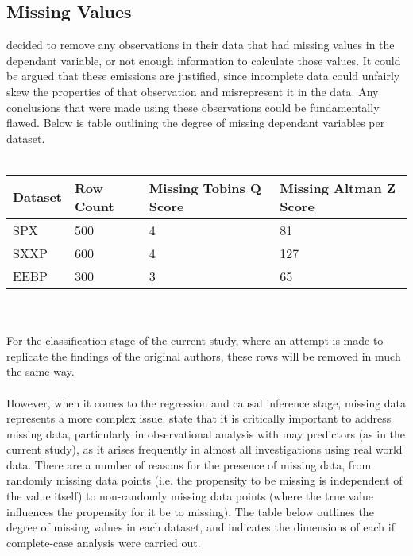 \subsection{Missing Values}\label{MissingValues}
{\cite{moldovan2015learning} decided to remove any observations in their data that had missing values in the dependant variable, or not enough information to calculate those values. It could be argued that these emissions are justified, since incomplete data could unfairly skew the properties of that observation and misrepresent it in the data. Any conclusions that were made using these observations could be fundamentally flawed. Below is table outlining the degree of missing dependant variables per dataset. 
\\\\
\begin{tabular}{ |p{3cm}||p{3cm}|p{3cm}|p{3cm}|  }
 \hline
 Dataset & Row Count & Missing Tobins Q Score & Missing Altman Z Score\\
 \hline
 SPX & 500 & 4  & 81 \\
 SXXP &   600  & 4  & 127 \\
 EEBP & 300 & 3 &  65 \\
 \hline
\end{tabular}\\\\
For the classification stage of the current study, where an attempt is made to replicate the findings of the original authors, these rows will be removed in much the same way. \\\\
However, when it comes to the regression and causal inference stage, missing data represents a more complex issue. \cite{hortonMissing} state that it is critically important to address missing data, particularly in observational analysis with may predictors (as in the current study), as it arises frequently in almost all investigations using real world data. There are a number of reasons for the presence of missing data, from randomly missing data points (i.e. the propensity to be missing is independent of the value itself) to non-randomly missing data points (where the true value influences the propensity for it be to missing). The table below outlines the degree of missing values in each dataset, and indicates the dimensions of each if complete-case analysis were carried out. \\\\
\begin{tabular}{ |p{3cm}||p{3cm}|p{3cm}|  }
 \hline

\end{tabular}}
